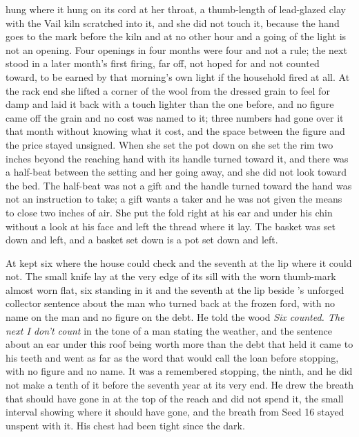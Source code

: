  hung where it hung on its cord at her throat, a thumb-length of lead-glazed clay with the Vail kiln scratched into it, and she did not touch it, because the hand goes to the mark before the kiln and at no other hour and a going of the light is not an opening. Four openings in four months were four and not a rule; the next stood in a later month's first firing, far off, not hoped for and not counted toward, to be earned by that morning's own light if the household fired at all. At the rack end she lifted a corner of the wool from the dressed grain to feel for damp and laid it back with a touch lighter than the one before, and no figure came off the grain and no cost was named to it; three numbers had gone over it that month without knowing what it cost, and the space between the figure and the price stayed unsigned. When she set the pot down on  she set the rim two inches beyond the reaching hand with its handle turned toward it, and there was a half-beat between the setting and her going away, and she did not look toward the bed. The half-beat was not a gift and the handle turned toward the hand was not an instruction to take; a gift wants a taker and he was not given the means to close two inches of air. She put the fold right at his ear and under his chin without a look at his face and left the thread where it lay. The basket was set down and left, and a basket set down is a pot set down and left.

At   kept six where the house could check and the seventh at the lip where it could not. The small knife lay at the very edge of its sill with the worn thumb-mark almost worn flat, six standing in it and the seventh at the lip beside 's unforged collector sentence about the man who turned back at the frozen ford, with no name on the man and no figure on the debt. He told the wood \emph{Six counted. The next I don't count} in the tone of a man stating the weather, and the sentence about an ear under this roof being worth more than the debt that held it came to his teeth and went as far as the word that would call the loan before stopping, with no figure and no name. It was a remembered stopping, the ninth, and he did not make a tenth of it before the seventh year at its very end. He drew the breath that should have gone in at the top of the reach and did not spend it, the small interval showing where it should have gone, and the breath from Seed 16 stayed unspent with it. His chest had been tight since the dark.

